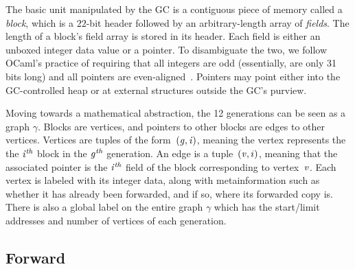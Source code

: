 \documentclass[acmsmall,screen]{acmart}
\newcommand\hide[1]{}
\newcommand{\tx}[1]{\text{#1}}
\begin{document}
The basic unit manipulated by the GC is a
contiguous piece of memory called a \emph{block}, which is a 
$22$-bit header followed by an arbitrary-length array of \emph{fields}.
The length of a block's field array is stored in its header.
Each field is either an unboxed integer data value or a pointer. 
To disambiguate the two,
we follow OCaml's practice of requiring that all integers are odd 
(essentially, are only 31 bits long) and all pointers are even-aligned~\cite{realworldocaml}. Pointers may point either into the GC-controlled heap or at external structures outside the GC's purview.


Moving towards a mathematical abstraction, the 12 generations can be seen
as a graph $\gamma$. Blocks are
vertices, and pointers to other blocks are edges to other
vertices. 
Vertices are tuples of the form~$(\mathit{g}, \mathit{i})$, meaning the vertex represents the 
the $\mathit{i}^{\textit{th}}$ block in the $\mathit{g}^{\textit{th}}$ generation. 
An edge is a tuple~$(\mathit{v}, i)$, meaning that 
the associated pointer is the $\mathit{i}^{\textit{th}}$ field of the block
corresponding to vertex~$\mathit{v}$. 
Each vertex is labeled with its integer data, along with 
metainformation such as whether it has already been forwarded, 
and if so, where its forwarded copy is.
There is also a global label on the entire graph $\gamma$ which has the
start/limit addresses and number of vertices of each generation. 


\hide
{\color{red} TODO

The graph model changed not at all. We added label to the whole graph. Quite happy to add this change to our model; it doesn't change the other proofs at all. We are genuinely not isomorphic so this label helps.

What was challenging:
	- We were very aggressive in dealing with complex C-light code, right at the edge of undefined behavior
	- Interface between C-light and mathgraph... the top level theorems and forward are exploring the graph in a connected way, but do scan is making a linear array survey. We needed proofs about these two views being okay. Complex labels, edges, etc
	- Exposing these proofs to a compiler and making sure that the compiler's own invariants can use the GC. eg: compiler will never take an item from an older gen and point it to a newer gen.
}

\subsection{Forward}
\label{sec:gcforward}
\renewcommand{\tx}[1]{\scriptsize {\text{#1}}}
\end{document}
